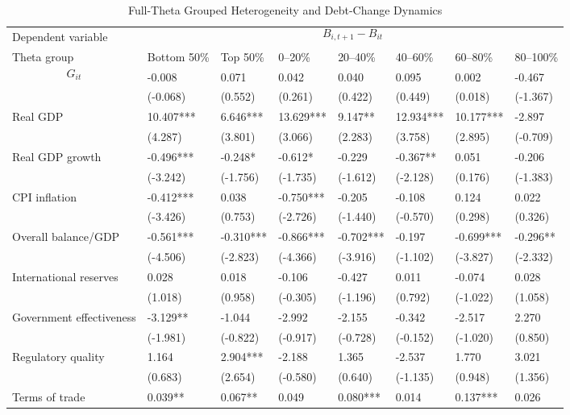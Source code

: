 \begin{table}[H]\centering
\begin{threeparttable}
\caption{Full-Theta Grouped Heterogeneity and Debt-Change Dynamics}
\label{tab:theta_group_heterogeneity_debt}
\scriptsize
\begin{tabularx}{\textwidth}{lYYYYYYY}
\toprule
Dependent variable &  \\
\cmidrule(lr){2-8}
Theta group & Bottom 50\% & Top 50\% & 0--20\% & 20--40\% & 40--60\% & 60--80\% & 80--100\% \\
\midrule
$$G_{it}$$ & -0.008 & 0.071 & 0.042 & 0.040 & 0.095 & 0.002 & -0.467 \\
  & (-0.068) & (0.552) & (0.261) & (0.422) & (0.449) & (0.018) & (-1.367) \\
Real GDP & 10.407*** & 6.646*** & 13.629*** & 9.147** & 12.934*** & 10.177*** & -2.897 \\
  & (4.287) & (3.801) & (3.066) & (2.283) & (3.758) & (2.895) & (-0.709) \\
Real GDP growth & -0.496*** & -0.248* & -0.612* & -0.229 & -0.367** & 0.051 & -0.206 \\
  & (-3.242) & (-1.756) & (-1.735) & (-1.612) & (-2.128) & (0.176) & (-1.383) \\
CPI inflation & -0.412*** & 0.038 & -0.750*** & -0.205 & -0.108 & 0.124 & 0.022 \\
  & (-3.426) & (0.753) & (-2.726) & (-1.440) & (-0.570) & (0.298) & (0.326) \\
Overall balance/GDP & -0.561*** & -0.310*** & -0.866*** & -0.702*** & -0.197 & -0.699*** & -0.296** \\
  & (-4.506) & (-2.823) & (-4.366) & (-3.916) & (-1.102) & (-3.827) & (-2.332) \\
International reserves & 0.028 & 0.018 & -0.106 & -0.427 & 0.011 & -0.074 & 0.028 \\
  & (1.018) & (0.958) & (-0.305) & (-1.196) & (0.792) & (-1.022) & (1.058) \\
Government effectiveness & -3.129** & -1.044 & -2.992 & -2.155 & -0.342 & -2.517 & 2.270 \\
  & (-1.981) & (-0.822) & (-0.917) & (-0.728) & (-0.152) & (-1.020) & (0.850) \\
Regulatory quality & 1.164 & 2.904*** & -2.188 & 1.365 & -2.537 & 1.770 & 3.021 \\
  & (0.683) & (2.654) & (-0.580) & (0.640) & (-1.135) & (0.948) & (1.356) \\
Terms of trade & 0.039** & 0.067** & 0.049 & 0.080*** & 0.014 & 0.137*** & 0.026 \\

\end{tabularx}
\end{threeparttable}
\end{table}
